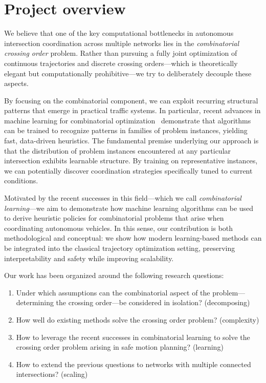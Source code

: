 \documentclass{report}
\theoremstyle{definition}
\theoremstyle{plain}
\begin{document}
\section{Project overview}

We believe that one of the key computational bottlenecks in autonomous
intersection coordination across multiple networks lies in the \emph{combinatorial crossing order}
problem. Rather than pursuing a fully joint optimization of continuous
trajectories and discrete crossing orders---which is theoretically elegant but
computationally prohibitive---we try to deliberately decouple these aspects.

By focusing on the combinatorial component, we can exploit recurring structural
patterns that emerge in practical traffic systems.
%
In particular, recent advances in machine learning for combinatorial
optimization~\cite{bengioMachineLearningCombinatorial2020,mazyavkinaReinforcementLearningCombinatorial2020,gasseExactCombinatorialOptimization2019,koolAttentionLearnSolve2019,zhangLearningDispatchJob2020}
demonstrate that algorithms can be trained to recognize patterns in families of
problem instances, yielding fast, data-driven heuristics.
%
The fundamental premise underlying our approach is that the distribution of
problem instances encountered at any particular intersection exhibits learnable
structure. By training on representative instances, we can potentially discover
coordination strategies specifically tuned to current conditions.

Motivated by the recent successes in this field---which we call
\emph{combinatorial learning}---we aim to demonstrate how machine learning
algorithms can be used to derive heuristic policies for combinatorial problems
that arise when coordinating autonomous vehicles. In this sense, our
contribution is both methodological and conceptual: we show how modern
learning-based methods can be integrated into the classical trajectory
optimization setting, preserving interpretability and safety while improving
scalability.

Our work has been organized around the following research questions:

\begin{enumerate}[label=\textbf{RQ\arabic*}:, leftmargin=3em, rightmargin=4em]
  \item Under which assumptions can the combinatorial aspect of the
        problem---determining the crossing order---be considered in isolation?
        (decomposing)

  \item How well do existing methods solve the crossing order problem?
        (complexity)

  \item How to leverage the recent successes in combinatorial learning to solve
        the crossing order problem arising in safe motion planning? (learning)

  \item How to extend the previous questions to networks with multiple connected
        intersections? (scaling)
\end{enumerate}
\end{document}
